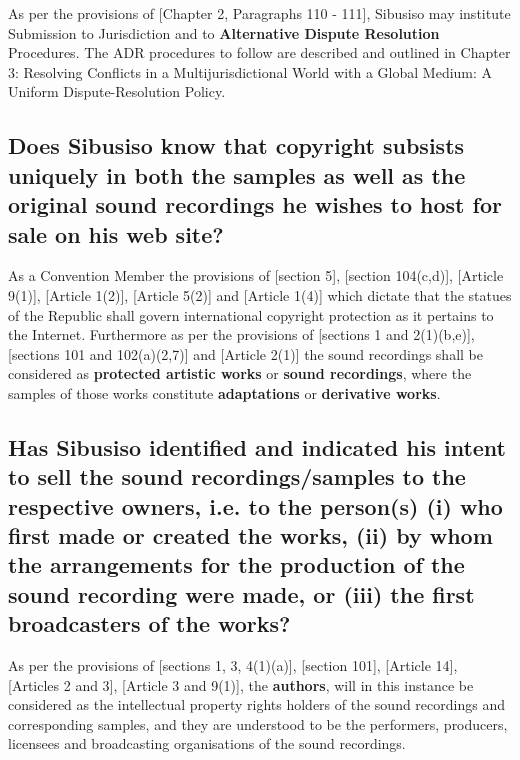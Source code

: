 \documentclass[11pt]{article}
\begin{document}
As per the provisions of [Chapter 2, Paragraphs 110 -
111]\cite{wipo99_management_dns_ip_report}, Sibusiso may institute Submission to
Jurisdiction and to \textbf{Alternative Dispute Resolution} Procedures. The ADR procedures to
follow are described and outlined in Chapter 3: Resolving Conflicts in a
Multijurisdictional World with a Global Medium: A Uniform Dispute-Resolution
Policy.

\subsection{Does Sibusiso know that copyright subsists uniquely in both the samples as well as the original sound recordings he wishes to host for sale on his web site?}
\label{sec:org70d2f39}
As a Convention Member the provisions of [section 5]\cite{rsa78_copyrightact},
[section 104(c,d)]\cite{usa76_title17_us_copyright_act}, [Article
9(1)]\cite{wto17_trips}, [Article 1(2)]\cite{eurlex00_elec_commerce}, [Article
5(2)]\cite{wipo86_berne} and [Article 1(4)]\cite{wipo96_copyright_treaty} which
dictate that the statues of the Republic shall govern international copyright
protection as it pertains to the Internet. Furthermore as per the provisions of
[sections 1 and 2(1)(b,e)]\cite{rsa78_copyrightact}, [sections 101 and
102(a)(2,7)]\cite{usa76_title17_us_copyright_act} and [Article
2(1)]\cite{wipo86_berne} the sound recordings shall be considered as \textbf{protected
artistic works} or \textbf{sound recordings}, where the samples of those works
constitute \textbf{adaptations} or \textbf{derivative works}.

\subsection{Has Sibusiso identified and indicated his intent to sell the sound recordings/samples to the respective owners, i.e. to the person(s) (i) who first made or created the works, (ii) by whom the arrangements for the production of the sound recording were made, or (iii) the first broadcasters of the works?}
\label{sec:orgf7ea0e9}
As per the provisions of [sections 1, 3, 4(1)(a)]\cite{rsa78_copyrightact},
[section 101]\cite{usa76_title17_us_copyright_act}, [Article 14]\cite{wto17_trips},
[Articles 2 and 3]\cite{wipo96_wppt}, [Article 3 and 9(1)]\cite{wipo86_berne}, the
\textbf{authors}, will in this instance be considered as the intellectual property
rights holders of the sound recordings and corresponding samples, and they are
understood to be the performers, producers, licensees and broadcasting
organisations of the sound recordings.
\end{document}
